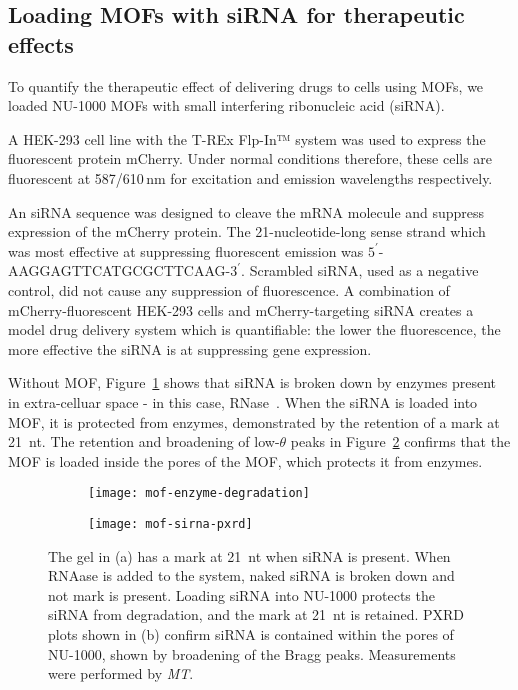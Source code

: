 \subsection{Loading MOFs with siRNA for therapeutic effects} \label{sec:MOF-siRNA}
To quantify the therapeutic effect of delivering drugs to cells using MOFs, we loaded NU-1000 MOFs with small interfering ribonucleic acid (siRNA).

A HEK-293 cell line with the T-REx Flp-In™ system was used to express the fluorescent protein mCherry.
Under normal conditions therefore, these cells are fluorescent at 587/610\,\si{\nano\meter} for excitation and emission wavelengths respectively.

An siRNA sequence was designed to cleave the mRNA molecule and suppress expression of the mCherry protein.
The 21-nucleotide-long sense strand which was most effective at suppressing fluorescent emission was $5^\prime$-AAGGAGTTCATGCGCTTCAAG-$3^\prime$.
Scrambled siRNA, used as a negative control, did not cause any suppression of fluorescence.
A combination of mCherry-fluorescent HEK-293 cells and mCherry-targeting siRNA creates a model drug delivery system which is quantifiable: the lower the fluorescence, the more effective the siRNA is at suppressing gene expression.

Without MOF, Figure~\ref{fig:mof-enzyme-degradation} shows that siRNA is broken down by enzymes present in extra-celluar space - in this case, RNase~\cite{chirgwin1979isolation}.
When the siRNA is loaded into MOF, it is protected from enzymes, demonstrated by the retention of a mark at \SI{21}{nt}.
The retention and broadening of low-$\theta$ peaks in Figure~\ref{fig:mof-sirna-pxrd} confirms that the MOF is loaded inside the pores of the MOF, which protects it from enzymes.

\begin{figure}[htbp!]
	\centering
	\begin{subfigure}[b]{0.49\textwidth}
		\texttt{[image: mof-enzyme-degradation]}
		\caption{} \label{fig:mof-enzyme-degradation}
	\end{subfigure}
	\hfill
	\begin{subfigure}[b]{0.49\textwidth}
		\texttt{[image: mof-sirna-pxrd]}
		\caption{} \label{fig:mof-sirna-pxrd}
	\end{subfigure}
	\caption[MOFs: NU-1000 protects siRNA from degradation by enzymes in extracellular space]{The gel in (a) has a mark at \SI{21}{nt} when siRNA is present. When RNAase is added to the system, naked siRNA is broken down and not mark is present. Loading siRNA into NU-1000 protects the siRNA from degradation, and the mark at \SI{21}{nt} is retained. PXRD plots shown in (b) confirm siRNA is contained within the pores of NU-1000, shown by broadening of the Bragg peaks. Measurements were performed by \textit{MT}. }
\label{fig:mof-enzyme-pxrd}
\end{figure}


